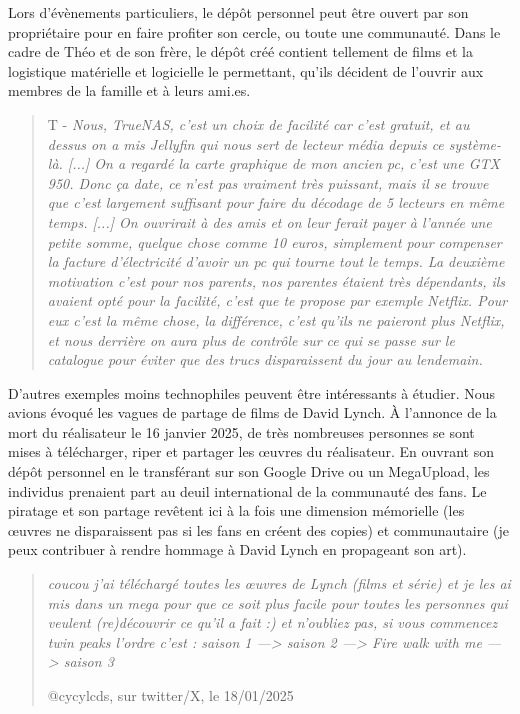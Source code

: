 Lors d'évènements particuliers, le dépôt personnel peut être ouvert par son propriétaire pour en faire profiter son cercle, ou toute une communauté. Dans le cadre de Théo et de son frère, le dépôt créé contient tellement de films et la logistique matérielle et logicielle le permettant, qu'ils décident de l'ouvrir aux membres de la famille et à leurs ami.es.

\begin{quote}
    T - \textit{Nous, TrueNAS, c'est un choix de facilité car c'est gratuit, et au dessus on a mis Jellyfin qui nous sert de lecteur média depuis ce système-là. [...] On a regardé la carte graphique de mon ancien pc, c'est une GTX 950. Donc ça date, ce n'est pas vraiment très puissant, mais il se trouve que c'est largement suffisant pour faire du décodage de 5 lecteurs en même temps. [...] On ouvrirait à des amis et on leur ferait payer à l'année une petite somme, quelque chose comme 10 euros, simplement pour compenser la facture d'électricité d'avoir un pc qui tourne tout le temps. La deuxième motivation c'est pour nos parents, nos parentes étaient très dépendants, ils avaient opté pour la facilité, c'est que te propose par exemple Netflix. Pour eux c'est la même chose, la différence, c'est qu'ils ne paieront plus Netflix, et nous derrière on aura plus de contrôle sur ce qui se passe sur le catalogue pour éviter que des trucs disparaissent du jour au lendemain.}
\end{quote}

D'autres exemples moins technophiles peuvent être intéressants à étudier. Nous avions évoqué les vagues de partage de films de David Lynch. À l'annonce de la mort du réalisateur le 16 janvier 2025, de très nombreuses personnes se sont mises à télécharger, riper et partager les œuvres du réalisateur. En ouvrant son dépôt personnel en le transférant sur son Google Drive ou un MegaUpload, les individus prenaient part au deuil international de la communauté des fans. Le piratage et son partage revêtent ici à la fois une dimension mémorielle (les œuvres ne disparaissent pas si les fans en créent des copies) et communautaire (je peux contribuer à rendre hommage à David Lynch en propageant son art).

\begin{quote}
\textit{    coucou j’ai téléchargé toutes les œuvres de Lynch (films et série) et je les ai mis dans un mega pour que ce soit plus facile pour toutes les personnes qui veulent (re)découvrir ce qu’il a fait :) et n’oubliez pas, si vous commencez twin peaks l’ordre c’est : saison 1 —> saison 2 —> Fire walk with me —> saison 3
}

    @cycylcds, sur twitter/X, le 18/01/2025
\end{quote}

